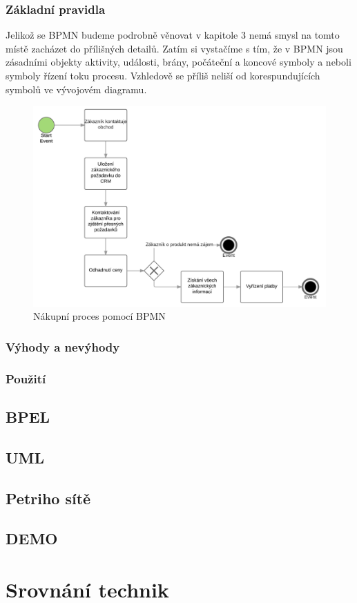 \documentclass[]{article}
\begin{document}
\subsubsection{Základní pravidla}
Jelikož se BPMN budeme podrobně věnovat v kapitole 3 %
nemá smysl na tomto místě zacházet do přílišných detailů. Zatím si vystačíme s tím, že v BPMN jsou zásadními objekty aktivity, události, brány, počáteční a koncové symboly a  neboli symboly řízení toku procesu. Vzhledově se příliš neliší od korespundujících symbolů ve vývojovém diagramu.

\begin{figure}[H]\centering %
\includegraphics[width=1.0\textwidth]{obrazky/bpmn_nakupniproces}
\caption{Nákupní proces pomocí BPMN}
\label{fig:BPMN_nakupniproces}
\end{figure}

\subsubsection{Výhody a nevýhody}
\subsubsection{Použití}

\subsection{BPEL}
\subsection{UML}
\subsection{Petriho sítě}
\subsection{DEMO}
\section{Srovnání technik}

\nocite{*}


\end{document}

